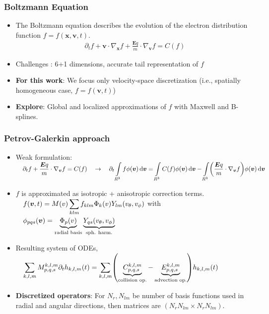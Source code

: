 \documentclass[mathserif, aspectratio=169]{beamer}
\newcommand{\ud}{\,\mathrm{d}}
\newcommand{\vect}[1]{\boldsymbol{#1}}
\newcommand{\of}[1]{\mleft( #1 \mright)}
\newcommand{\myint}{\int\limits}
\begin{document}
\begin{frame}
	\frametitle{Boltzmann Equation}
\begin{itemize}
	\item The Boltzmann equation describes the evolution of the electron distribution function $f=f(\vect{x}, \vect{v}, t)$. %
	\begin{align}
		\partial_t f + \vect{v}\cdot \nabla_{\vect{x}} f  + \frac{\vect{E} q}{m} \cdot \nabla_{\vect{v }}f = C(f)
	\end{align}
	\item Challenges : 6+1 dimensions, accurate tail representation of $f$
	\item \textbf{For this work}: We focus only velocity-space discretization (i.e., spatially homogeneous case, $f=f(\vect{v}, t)$) 
	\item \textbf{Explore}: Global and localized approximations of $f$ with Maxwell and B-splines. 
\end{itemize}
\end{frame}

\begin{frame}
	\frametitle{Petrov-Galerkin approach}
	\small
	\begin{itemize}
		\item Weak formulation:
		$
		\displaystyle
		\quad
		\partial_t f + \frac{\vect{E} q}{m} \cdot \nabla_{\vect{v}}f = C(f)
		\quad \rightarrow \quad
		\partial_t \myint_{R^3} f \phi\of{\vect{v}} \ud \vect{v} = 
		\myint_{R^3} C(f) \phi\of{\vect{v}} \ud \vect{v} - \myint_{R^3} \of{\frac{\vect{E} q}{m} \cdot \nabla_{\vect{v}} f} \phi(\vect{v}) \ud\vect{v}
		$

		\item $f$ is approximated as isotropic + anisotropic correction terms.
		$
		\displaystyle
		\quad 
		f(\vect{v},t) = M(v)\sum_{klm} f_{klm} \Phi_k\of{v} Y_{lm}\of{v_\theta, v_\phi}$ with $
		\displaystyle
		\quad 
		\phi_{pqs}\of{\vect{v}} = \underbrace{\Phi_p\of{v}}_{\text{radial basis}} \underbrace{Y_{qs}\of{v_\theta, v_\phi}}_{\tiny\text{sph. harm.}}$

		\item Resulting system of ODEs, 
		$ \displaystyle
		\quad 
		\sum_{k,l,m} M_{p,q,s}^{k,l,m} \partial_t h_{k,l,m}\of{t} = \sum_{k,l,m}  \of{\underbrace{C_{p,q,s}^{k,l,m}}_{\text{collision op.}}  - \underbrace{E_{p,q,s}^{k,l,m}}_{\text{advection op.}}} h_{k,l,m}\of{t}$
		\item \textbf{Discretized operators}: For $N_r, N_{lm}$ be number of basis functions used in radial and angular directions, then matrices are $(N_rN_{lm} \times N_rN_{lm})$.
	\end{itemize}
\end{frame}
\end{document}
